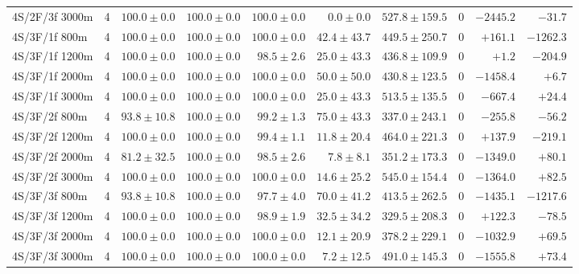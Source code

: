 \begin{tabular}{l r r r r r r r r r}
4S/2F/3f 3000m & 4 & $100.0 \pm 0.0$ & $100.0 \pm 0.0$ & $100.0 \pm 0.0$ & $0.0 \pm 0.0$ & $527.8 \pm 159.5$ & $0$ & $-2445.2$ & $-31.7$ \\
4S/3F/1f 800m & 4 & $100.0 \pm 0.0$ & $100.0 \pm 0.0$ & $100.0 \pm 0.0$ & $42.4 \pm 43.7$ & $449.5 \pm 250.7$ & $0$ & $+161.1$ & $-1262.3$ \\
4S/3F/1f 1200m & 4 & $100.0 \pm 0.0$ & $100.0 \pm 0.0$ & $98.5 \pm 2.6$ & $25.0 \pm 43.3$ & $436.8 \pm 109.9$ & $0$ & $+1.2$ & $-204.9$ \\
4S/3F/1f 2000m & 4 & $100.0 \pm 0.0$ & $100.0 \pm 0.0$ & $100.0 \pm 0.0$ & $50.0 \pm 50.0$ & $430.8 \pm 123.5$ & $0$ & $-1458.4$ & $+6.7$ \\
4S/3F/1f 3000m & 4 & $100.0 \pm 0.0$ & $100.0 \pm 0.0$ & $100.0 \pm 0.0$ & $25.0 \pm 43.3$ & $513.5 \pm 135.5$ & $0$ & $-667.4$ & $+24.4$ \\
4S/3F/2f 800m & 4 & $93.8 \pm 10.8$ & $100.0 \pm 0.0$ & $99.2 \pm 1.3$ & $75.0 \pm 43.3$ & $337.0 \pm 243.1$ & $0$ & $-255.8$ & $-56.2$ \\
4S/3F/2f 1200m & 4 & $100.0 \pm 0.0$ & $100.0 \pm 0.0$ & $99.4 \pm 1.1$ & $11.8 \pm 20.4$ & $464.0 \pm 221.3$ & $0$ & $+137.9$ & $-219.1$ \\
4S/3F/2f 2000m & 4 & $81.2 \pm 32.5$ & $100.0 \pm 0.0$ & $98.5 \pm 2.6$ & $7.8 \pm 8.1$ & $351.2 \pm 173.3$ & $0$ & $-1349.0$ & $+80.1$ \\
4S/3F/2f 3000m & 4 & $100.0 \pm 0.0$ & $100.0 \pm 0.0$ & $100.0 \pm 0.0$ & $14.6 \pm 25.2$ & $545.0 \pm 154.4$ & $0$ & $-1364.0$ & $+82.5$ \\
4S/3F/3f 800m & 4 & $93.8 \pm 10.8$ & $100.0 \pm 0.0$ & $97.7 \pm 4.0$ & $70.0 \pm 41.2$ & $413.5 \pm 262.5$ & $0$ & $-1435.1$ & $-1217.6$ \\
4S/3F/3f 1200m & 4 & $100.0 \pm 0.0$ & $100.0 \pm 0.0$ & $98.9 \pm 1.9$ & $32.5 \pm 34.2$ & $329.5 \pm 208.3$ & $0$ & $+122.3$ & $-78.5$ \\
4S/3F/3f 2000m & 4 & $100.0 \pm 0.0$ & $100.0 \pm 0.0$ & $100.0 \pm 0.0$ & $12.1 \pm 20.9$ & $378.2 \pm 229.1$ & $0$ & $-1032.9$ & $+69.5$ \\
4S/3F/3f 3000m & 4 & $100.0 \pm 0.0$ & $100.0 \pm 0.0$ & $100.0 \pm 0.0$ & $7.2 \pm 12.5$ & $491.0 \pm 145.3$ & $0$ & $-1555.8$ & $+73.4$ \\
\bottomrule
\end{tabular}